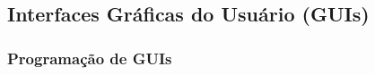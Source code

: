 

\subsection{Interfaces Gráficas do Usuário (GUIs)}
\label{sec:guis}

\subsubsection{Programação de GUIs}
\label{sec:gui_programming}

\label{sec:guis-desktop}


\label{sec:guis-web}

%
%


